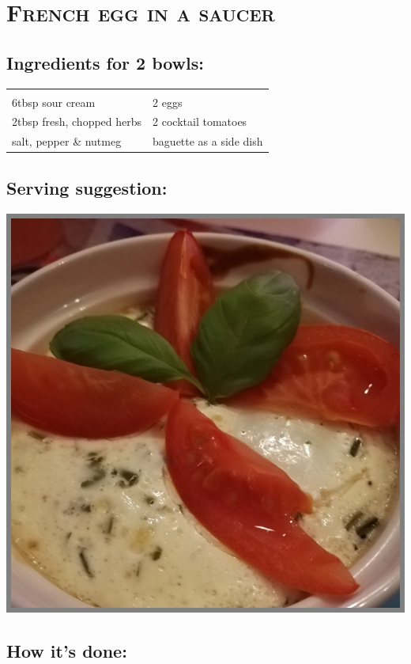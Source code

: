 \section{\textsc{French egg in a saucer}}

\subsection*{Ingredients for 2 bowls:}

\begin{tabular}{p{7.5cm} p{7.5cm}}
	& \\
	6tbsp sour cream & 2 eggs \\
	2tbsp fresh, chopped herbs  & 2 cocktail tomatoes \\
  salt, pepper \& nutmeg & baguette as a side dish
\end{tabular}

\subsection*{Serving suggestion:}

\includegraphics[width=\textwidth]{img/ei_naepfchen_franz.jpg} \cite{eiimnaepfchenfranz}

\subsection*{How it's done:}

